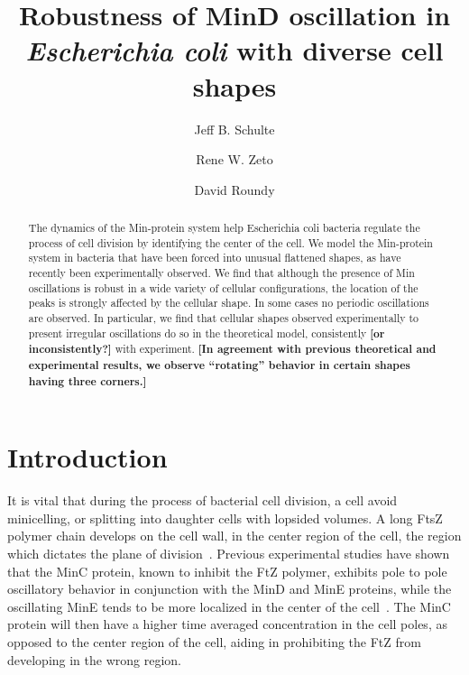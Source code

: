 \documentclass[letterpaper,twocolumn,amsmath,amssymb,pre]{revtex4-1}
\newcommand{\red}[1]{{\bf \color{red} #1}}
\newcommand{\fixme}[1]{\red{[#1]}}
\begin{document}
\title{Robustness of MinD oscillation in \emph{Escherichia coli} with
  diverse cell shapes}

\author{Jeff B. Schulte}
\author{Rene W. Zeto}
\author{David Roundy}

\begin{abstract}
  The dynamics of the Min-protein system help Escherichia coli
  bacteria regulate the process of cell division by identifying the
  center of the cell.  We model the Min-protein system in bacteria
  that have been forced into unusual flattened shapes, as have
  recently been experimentally observed.  We find that although the
  presence of Min oscillations is robust in a wide variety of cellular
  configurations, the location of the peaks is strongly affected by
  the cellular shape.  In some cases no periodic oscillations are
  observed.  In particular, we find that cellular shapes observed
  experimentally to present irregular oscillations do so in the
  theoretical model, consistently \fixme{or inconsistently?} with
  experiment.  \fixme{In agreement with previous theoretical and
    experimental results, we observe ``rotating'' behavior in certain
    shapes having three corners.}
\end{abstract}

\maketitle

\section{Introduction}
It is vital that during the process of bacterial cell division, a cell
avoid minicelling, or splitting into daughter cells with lopsided
volumes.  A long FtsZ polymer chain develops on the cell wall, in the
center region of the cell, the region which dictates the plane of
division~\cite{adams2009bacterial, lutkenhaus2007assembly}. Previous
experimental studies have shown that the MinC protein, known to
inhibit the FtZ polymer\cite{shen2010examination}, exhibits pole to
pole oscillatory behavior in conjunction with the MinD and MinE
proteins, while the oscillating MinE tends to be more localized in the
center of the cell~\cite{hu1999topological, fu2001mine,
  shapiro2009and, yu1999ftsz, raskin1999rapid}. The MinC protein will
then have a higher time averaged concentration in the cell poles, as
opposed to the center region of the cell, aiding in prohibiting the
FtZ from developing in the wrong region.
\end{document}
